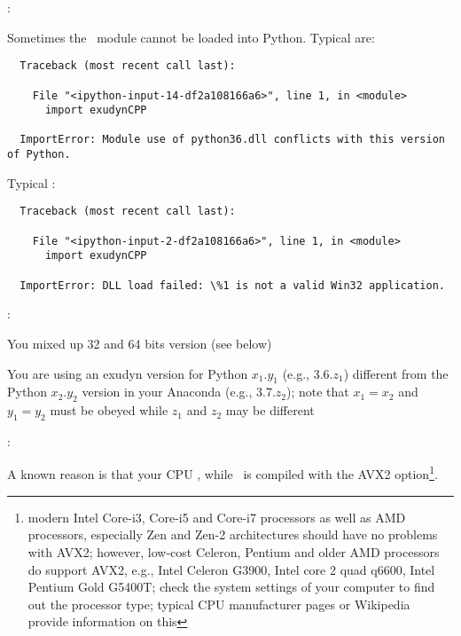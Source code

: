 \noindent {}:
\bi
  \item Sometimes the \codeName\ module cannot be loaded into Python. Typical  are: \vspace{1pt}\\
\plainlststyle
\begin{lstlisting}
  Traceback (most recent call last):

    File "<ipython-input-14-df2a108166a6>", line 1, in <module>
      import exudynCPP

  ImportError: Module use of python36.dll conflicts with this version of Python.
\end{lstlisting}
%
  Typical :\vspace{1pt}\\
\begin{lstlisting}
  Traceback (most recent call last):
  
    File "<ipython-input-2-df2a108166a6>", line 1, in <module>
      import exudynCPP

  ImportError: DLL load failed: \%1 is not a valid Win32 application.
\end{lstlisting}
%
  :
\bi
\item[$\ra$] You mixed up 32 and 64 bits version (see below) 
\item[$\ra$] You are using an exudyn version for Python $x_1.y_1$ (e.g., 3.6.$z_1$) different from the Python $x_2.y_2$ version in your Anaconda (e.g., 3.7.$z_2$); note that $x_1=x_2$ and $y_1=y_2$ must be obeyed while $z_1$ and $z_2$ may be different
\ei
\item {}:\\
\bi
\item[$\ra$] A known reason is that your CPU , while \codeName\ is compiled with the AVX2 option\footnote{modern Intel Core-i3, Core-i5 and Core-i7 processors as well as AMD processors, especially Zen and Zen-2 architectures should have no problems with AVX2; however, low-cost Celeron, Pentium and older AMD processors do  support AVX2, e.g.,  Intel Celeron G3900, Intel core 2 quad q6600, Intel Pentium Gold G5400T; check the system settings of your computer to find out the processor type; typical CPU manufacturer pages or Wikipedia provide information on this}.
